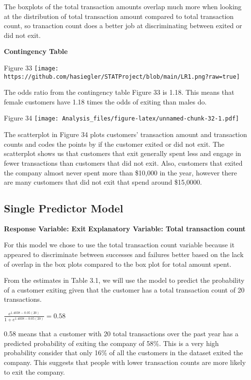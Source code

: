 \documentclass[
]{article}
\begin{document}
The boxplots of the total transaction amounts overlap much more when
looking at the distribution of total transaction amount compared to
total transaction count, so tranaction count does a better job at
discriminating between exited or did not exit.

\textbf{Contingency Table}

Figure 33
\texttt{[image: https://github.com/hasiegler/STATProject/blob/main/LR1.png?raw=true]}

The odds ratio from the contingency table Figure 33 is 1.18. This means
that female customers have 1.18 times the odds of exiting than males do.

Figure 34
\texttt{[image: Analysis\_files/figure-latex/unnamed-chunk-32-1.pdf]}

The scatterplot in Figure 34 plots customers' transaction amount and
transaction counts and codes the points by if the customer exited or did
not exit. The scatterplot shows us that customers that exit generally
spent less and engage in fewer transactions than customers that did not
exit. Also, customers that exited the company almost never spent more
than \$10,000 in the year, however there are many customers that did not
exit that spend around \$15,0000.

\hypertarget{single-predictor-model}{%
\subsection{Single Predictor Model}\label{single-predictor-model}}

\textbf{Response Variable: Exit} \textbf{Explanatory Variable: Total
transaction count}

For this model we chose to use the total transaction count variable
because it appeared to discriminate between successes and failures
better based on the lack of overlap in the box plots compared to the box
plot for total amount spent.

From the estimates in Table 3.1, we will use the model to predict the
probability of a customer exiting given that the customer has a total
transaction count of 20 transactions.

\(\frac{e^{1.4038 - 0.05(20)}}{1 + e^{1.4038 - 0.05(20)}} = 0.58\)

0.58 means that a customer with 20 total transactions over the past year
has a predicted probability of exiting the company of 58\%. This is a
very high probability consider that only 16\% of all the customers in
the dataset exited the company. This suggests that people with lower
transaction counts are more likely to exit the company.
\end{document}
